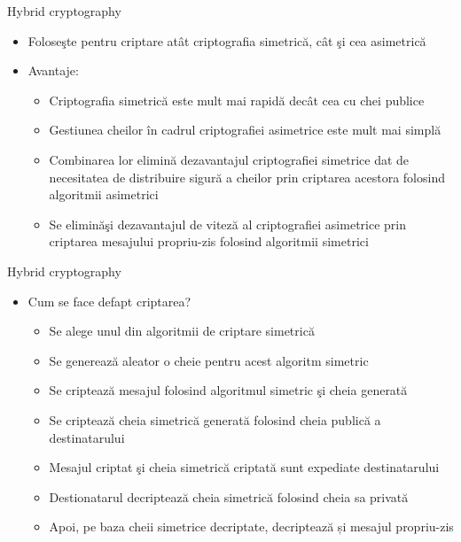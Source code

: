 \documentclass[pdf]{beamer}
\begin{document}
\begin{frame}{Hybrid cryptography}
\begin{itemize}
\item
Foloseşte pentru criptare atât criptografia simetrică, cât şi cea asimetrică
\item
Avantaje:
\begin{itemize}
\item
Criptografia simetrică este mult mai rapidă decât cea cu chei publice
\item
Gestiunea cheilor în cadrul criptografiei asimetrice este mult mai simplă
\item
Combinarea lor elimină dezavantajul criptografiei simetrice dat de necesitatea de distribuire sigură a cheilor prin criptarea acestora folosind algoritmii asimetrici
\item
Se eliminăşi dezavantajul de viteză al criptografiei asimetrice prin criptarea mesajului propriu-zis folosind algoritmii simetrici
\end{itemize}
\end{itemize}
\end{frame}



\begin{frame}{Hybrid cryptography}
\begin{itemize}
\item
Cum se face defapt criptarea?
\begin{itemize}
\item
Se alege unul din algoritmii de criptare simetrică
\item
Se generează aleator o cheie pentru acest algoritm simetric
\item
Se criptează mesajul folosind algoritmul simetric şi cheia generată
\item
Se criptează cheia simetrică generată folosind cheia publică a destinatarului
\item
Mesajul criptat şi cheia simetrică criptată sunt expediate destinatarului
\item
Destionatarul decriptează cheia simetrică folosind cheia sa privată
\item
Apoi, pe baza cheii simetrice decriptate, decriptează și mesajul propriu-zis
\end{itemize}
\end{itemize}
\end{frame}
\end{document}
